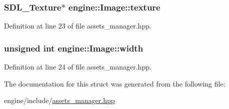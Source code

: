 \subsubsection[{\texorpdfstring{texture}{texture}}]{\setlength{\rightskip}{0pt plus 5cm}S\+D\+L\+\_\+\+Texture$\ast$ engine\+::\+Image\+::texture}\hypertarget{structengine_1_1_image_a1aba43ce4fe48d3c18e4db97543c1077}{}\label{structengine_1_1_image_a1aba43ce4fe48d3c18e4db97543c1077}


Definition at line 23 of file assets\+\_\+manager.\+hpp.

\subsubsection[{\texorpdfstring{width}{width}}]{\setlength{\rightskip}{0pt plus 5cm}unsigned int engine\+::\+Image\+::width}\hypertarget{structengine_1_1_image_a705d917a73360772b548c2b8a9a47969}{}\label{structengine_1_1_image_a705d917a73360772b548c2b8a9a47969}


Definition at line 24 of file assets\+\_\+manager.\+hpp.



The documentation for this struct was generated from the following file\+:\begin{DoxyCompactItemize}
\item 
engine/include/\hyperlink{assets__manager_8hpp}{assets\+\_\+manager.\+hpp}\end{DoxyCompactItemize}
